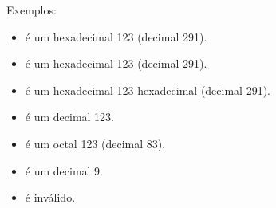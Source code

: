 \documentclass[letterpaper,10pt,brazil]{sphinxmanual}
\begin{document}
Exemplos:
\begin{itemize}
\item {} 
 é um hexadecimal 123 (decimal 291).

\item {} 
 é um hexadecimal 123 (decimal 291).

\item {} 
 é um hexadecimal 123 hexadecimal (decimal 291).

\item {} 
 é um decimal 123.

\item {} 
 é um octal 123 (decimal 83).

\item {} 
 é um decimal 9.

\item {} 
 é inválido.

\end{itemize}
\end{document}

